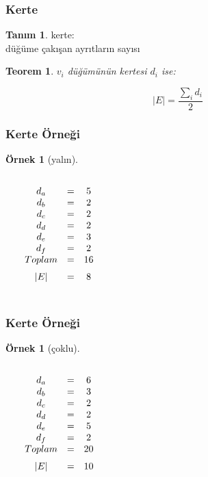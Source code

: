 \documentclass[dvipsnames]{beamer}
\theoremstyle{definition}
\newtheorem{tanim}[theorem]{Tanım}
\theoremstyle{example}
\newtheorem{ornek}[theorem]{Örnek}
\theoremstyle{plain}
\newtheorem{teorem}[theorem]{Teorem}
\begin{document}
\begin{frame}
  \frametitle{Kerte}

  \begin{tanim}
    \alert{kerte}:\\
    düğüme çakışan ayrıtların sayısı
  \end{tanim}

  \pause
  \begin{teorem}
    $v_i$ düğümünün kertesi $d_i$ ise:

    \[ |E| = \frac{\sum_i d_i}{2} \]
  \end{teorem}
\end{frame}

\begin{frame}
  \frametitle{Kerte Örneği}

  \begin{ornek}[yalın]
    \begin{columns}
      \begin{center}
      \end{center}

      $\begin{array}{ccc}
      d_a & = & 5\\
      d_b & = & 2\\
      d_c & = & 2\\
      d_d & = & 2\\
      d_e & = & 3\\
      d_f & = & 2\\
      \medskip
      Toplam & = & 16\\
      \medskip
      |E| & = & 8
      \end{array}$
    \end{columns}
  \end{ornek}
\end{frame}

\begin{frame}
  \frametitle{Kerte Örneği}

  \begin{ornek}[çoklu]
    \begin{columns}
      \begin{center}
      \end{center}

      $\begin{array}{ccc}
      d_a & = & 6\\
      d_b & = & 3\\
      d_c & = & 2\\
      d_d & = & 2\\
      d_e & = & 5\\
      d_f & = & 2\\
      \medskip
      Toplam & = & 20\\
      \medskip
      |E| & = & 10
      \end{array}$
    \end{columns}
  \end{ornek}
\end{frame}
\end{document}
